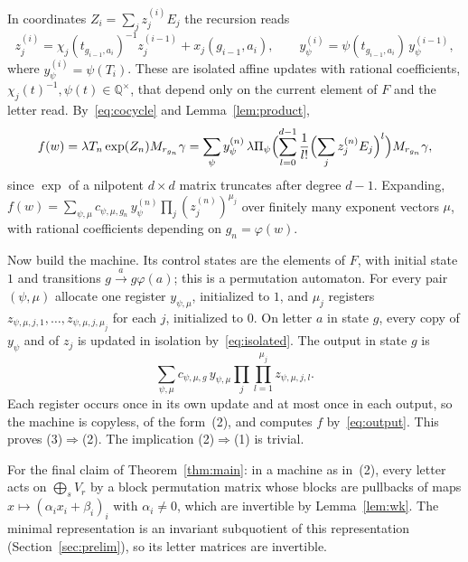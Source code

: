 \documentclass[acmlarge,screen,11pt,nonacm,natbib=false]{acmart}
\newcommand{\Q}{\mathbb{Q}}
\theoremstyle{definition}
\begin{document}
In coordinates $Z_i=\sum_jz_j^{(i)}E_j$ the recursion reads
\begin{equation}\label{eq:isolated}
z_j^{(i)}=\chi_j(t_{g_{i-1},a_i})^{-1}z_j^{(i-1)}+x_j(g_{i-1},a_i),\qquad
y_\psi^{(i)}=\psi(t_{g_{i-1},a_i})\,y_\psi^{(i-1)},
\end{equation}
where $y_\psi^{(i)}=\psi(T_i)$. These are isolated affine updates with rational coefficients, $\chi_j(t)^{-1},\psi(t)\in\Q^\times$, that depend only on the current element of $F$ and the letter read. By~\eqref{eq:cocycle} and Lemma~\ref{lem:product},
\begin{equation}\label{eq:output}
f(w)=\lambda T_n\exp(Z_n)M_{r_{g_n}}\gamma=\sum_\psi y^{(n)}_\psi\,\lambda\Pi_\psi\Bigl(\sum_{l=0}^{d-1}\frac1{l!}\Bigl(\sum_jz^{(n)}_jE_j\Bigr)^l\Bigr)M_{r_{g_n}}\gamma ,
\end{equation}
since $\exp$ of a nilpotent $d\times d$ matrix truncates after degree $d-1$. Expanding, $f(w)=\sum_{\psi,\mu}c_{\psi,\mu,g_n}\,y_\psi^{(n)}\prod_j(z_j^{(n)})^{\mu_j}$ over finitely many exponent vectors $\mu$, with rational coefficients depending on $g_n=\varphi(w)$.

Now build the machine. Its control states are the elements of $F$, with initial state $1$ and transitions $g\xrightarrow{a}g\varphi(a)$; this is a permutation automaton. For every pair $(\psi,\mu)$ allocate one register $y_{\psi,\mu}$, initialized to $1$, and $\mu_j$ registers $z_{\psi,\mu,j,1},\ldots,z_{\psi,\mu,j,\mu_j}$ for each $j$, initialized to $0$. On letter $a$ in state $g$, every copy of $y_\psi$ and of $z_j$ is updated in isolation by~\eqref{eq:isolated}. The output in state $g$ is
\[
\sum_{\psi,\mu}c_{\psi,\mu,g}\,y_{\psi,\mu}\prod_j\prod_{l=1}^{\mu_j}z_{\psi,\mu,j,l}.
\]
Each register occurs once in its own update and at most once in each output, so the machine is copyless, of the form~(2), and computes $f$ by~\eqref{eq:output}. This proves (3)$\Rightarrow$(2). The implication (2)$\Rightarrow$(1) is trivial.

For the final claim of Theorem~\ref{thm:main}: in a machine as in~(2), every letter acts on $\bigoplus_{s}V_r$ by a block permutation matrix whose blocks are pullbacks of maps $x\mapsto(\alpha_ix_i+\beta_i)_i$ with $\alpha_i\ne0$, which are invertible by Lemma~\ref{lem:wk}. The minimal representation is an invariant subquotient of this representation (Section~\ref{sec:prelim}), so its letter matrices are invertible.
\end{document}

